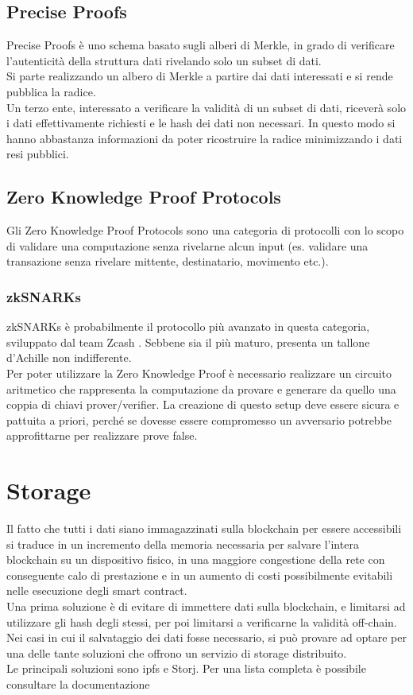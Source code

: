 \subsection{Precise Proofs}
Precise Proofs è uno schema basato sugli alberi di Merkle, in grado di verificare l'autenticità della struttura dati rivelando solo un subset di dati. \\
Si parte realizzando un albero di Merkle a partire dai dati interessati e si rende pubblica la radice. \\
Un terzo ente, interessato a verificare la validità di un subset di dati, riceverà solo i dati effettivamente richiesti e le hash dei dati non necessari.
In questo modo si hanno abbastanza informazioni da poter ricostruire la radice minimizzando i dati resi pubblici.

\subsection{Zero Knowledge Proof Protocols}
Gli Zero Knowledge Proof Protocols sono una categoria di protocolli con lo scopo di validare una computazione senza rivelarne alcun input (es. validare una transazione senza rivelare mittente, destinatario, movimento etc.).

\subsubsection{zkSNARKs}
zkSNARKs è probabilmente il protocollo più avanzato in questa categoria, sviluppato dal team Zcash \cite{wiki:zkSNARKs}.
Sebbene sia il più maturo, presenta un tallone d'Achille non indifferente. \\
Per poter utilizzare la Zero Knowledge Proof è necessario realizzare un circuito aritmetico che rappresenta la computazione da provare e generare da quello una coppia di chiavi prover/verifier.
La creazione di questo setup deve essere sicura e pattuita a priori, perché se dovesse essere compromesso un avversario potrebbe approfittarne per realizzare prove false.


\section{Storage}
Il fatto che tutti i dati siano immagazzinati sulla blockchain per essere accessibili si traduce in un incremento della memoria necessaria per salvare l'intera blockchain su un dispositivo fisico,
in una maggiore congestione della rete con conseguente calo di prestazione e in un aumento di costi possibilmente evitabili nelle esecuzione degli smart contract. \\
Una prima soluzione è di evitare di immettere dati sulla blockchain, e limitarsi ad utilizzare gli hash degli stessi, per poi limitarsi a verificarne la validità off-chain. \\
Nei casi in cui il salvataggio dei dati fosse necessario, si può provare ad optare per una delle tante soluzioni che offrono un servizio di storage distribuito. \\
Le principali soluzioni sono \gls{ipfs} e Storj.
Per una lista completa è possibile consultare la documentazione \cite{wiki:ew-storage}

